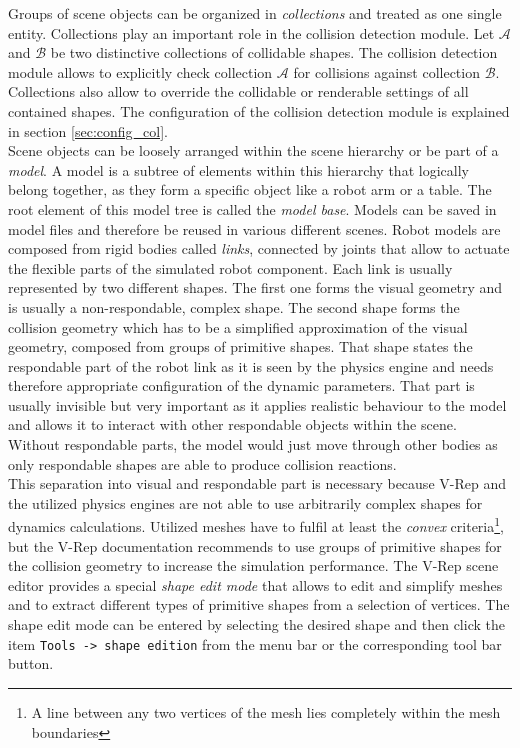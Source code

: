 Groups of scene objects can be organized in \emph{collections} and treated as one single entity. Collections play an important role in the collision detection module. Let $\mathcal{A}$ and $\mathcal{B}$ be two distinctive collections of collidable shapes. The collision detection module allows to explicitly check collection $\mathcal{A}$ for collisions against collection $\mathcal{B}$. Collections also allow to override the collidable or renderable settings of all contained shapes. The configuration of the collision detection module is explained in section \ref{sec:config_col}. \\

Scene objects can be loosely arranged within the scene hierarchy or be part of a \emph{model}. A model is a subtree of elements within this hierarchy that logically belong together, as they form a specific object like a robot arm or a table. The root element of this model tree is called the \emph{model base}. Models can be saved in model files and therefore be reused in various different scenes. Robot models are composed from rigid bodies called \emph{links}, connected by joints that allow to actuate the flexible parts of the simulated robot component. Each link is usually represented by two different shapes. The first one forms the visual geometry and is usually a non-respondable, complex shape. The second shape forms the collision geometry which has to be a simplified approximation of the visual geometry, composed from groups of primitive shapes. That shape states the respondable part of the robot link as it is seen by the physics engine and needs therefore appropriate configuration of the dynamic parameters. That part is usually invisible but very important as it applies realistic behaviour to the model and allows it to interact with other respondable objects within the scene. Without respondable parts, the model would just move through other bodies as only respondable shapes are able to produce collision reactions. \\

This separation into visual and respondable part is necessary because V-Rep and the utilized physics engines are not able to use arbitrarily complex shapes for dynamics calculations. Utilized meshes have to fulfil at least the \emph{convex} criteria\footnote{A line between any two vertices of the mesh lies completely within the mesh boundaries}, but the V-Rep documentation recommends to use groups of primitive shapes for the collision geometry to increase the simulation performance. The V-Rep scene editor provides a special \emph{shape edit mode} that allows to edit and simplify meshes and to extract different types of primitive shapes from a selection of vertices. The shape edit mode can be entered by selecting the desired shape and then click the item \texttt{Tools -> shape edition} from the menu bar or the corresponding tool bar button.

